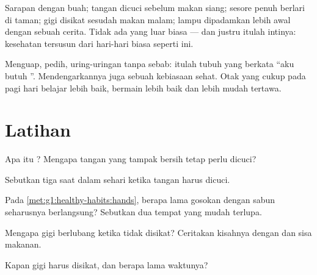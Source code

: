 \begin{example}\label{ex:g1:healthy-habits:day}
Sarapan dengan buah; tangan dicuci sebelum makan siang; sesore penuh
berlari di taman; gigi disikat sesudah makan malam; lampu dipadamkan
lebih awal dengan sebuah cerita. Tidak ada yang luar biasa --- dan
justru itulah intinya: kesehatan tersusun dari hari-hari biasa seperti
ini.
\end{example}

\begin{remark}\label{rem:g1:healthy-habits:tired}
Menguap,  pedih, uring-uringan tanpa sebab: itulah tubuh yang
berkata ``aku butuh ''. Mendengarkannya juga sebuah kebiasaan
sehat. Otak yang cukup  pada pagi hari belajar lebih baik,
bermain lebih baik dan lebih mudah tertawa.
\end{remark}

\section{Latihan}

\begin{exercise}[$\star$]\label{exo:g1:healthy-habits:1}
Apa itu ? Mengapa tangan yang tampak bersih tetap perlu dicuci?
\end{exercise}

\begin{exercise}[$\star$]\label{exo:g1:healthy-habits:2}
Sebutkan tiga saat dalam sehari ketika tangan harus dicuci.
\end{exercise}

\begin{exercise}[$\star$]\label{exo:g1:healthy-habits:3}
Pada \cref{met:g1:healthy-habits:hands}, berapa lama gosokan dengan
sabun seharusnya berlangsung? Sebutkan dua tempat yang mudah terlupa.
\end{exercise}

\begin{exercise}[$\star$]\label{exo:g1:healthy-habits:4}
Mengapa gigi berlubang ketika tidak disikat? Ceritakan kisahnya dengan
 dan sisa makanan.
\end{exercise}

\begin{exercise}[$\star$]\label{exo:g1:healthy-habits:5}
Kapan gigi harus disikat, dan berapa lama waktunya?
\end{exercise}

